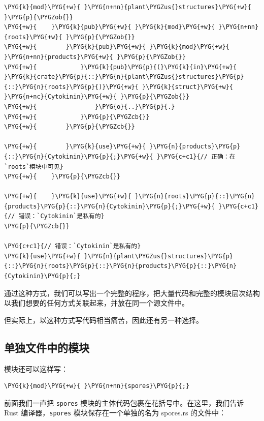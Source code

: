 \begin{Verbatim}[commandchars=\\\{\},breaklines=true,breakanywhere=true,fontsize=\codefont,xleftmargin=17bp]
\PYG{k}{mod}\PYG{+w}{ }\PYG{n+nn}{plant\PYGZus{}structures}\PYG{+w}{ }\PYG{p}{\PYGZob{}}
\PYG{+w}{    }\PYG{k}{pub}\PYG{+w}{ }\PYG{k}{mod}\PYG{+w}{ }\PYG{n+nn}{roots}\PYG{+w}{ }\PYG{p}{\PYGZob{}}
\PYG{+w}{        }\PYG{k}{pub}\PYG{+w}{ }\PYG{k}{mod}\PYG{+w}{ }\PYG{n+nn}{products}\PYG{+w}{ }\PYG{p}{\PYGZob{}}
\PYG{+w}{            }\PYG{k}{pub}\PYG{p}{(}\PYG{k}{in}\PYG{+w}{ }\PYG{k}{crate}\PYG{p}{::}\PYG{n}{plant\PYGZus{}structures}\PYG{p}{::}\PYG{n}{roots}\PYG{p}{)}\PYG{+w}{ }\PYG{k}{struct}\PYG{+w}{ }\PYG{n+nc}{Cytokinin}\PYG{+w}{ }\PYG{p}{\PYGZob{}}
\PYG{+w}{                }\PYG{o}{..}\PYG{p}{.}
\PYG{+w}{            }\PYG{p}{\PYGZcb{}}
\PYG{+w}{        }\PYG{p}{\PYGZcb{}}

\PYG{+w}{        }\PYG{k}{use}\PYG{+w}{ }\PYG{n}{products}\PYG{p}{::}\PYG{n}{Cytokinin}\PYG{p}{;}\PYG{+w}{ }\PYG{c+c1}{// 正确：在`roots`模块中可见}
\PYG{+w}{    }\PYG{p}{\PYGZcb{}}

\PYG{+w}{    }\PYG{k}{use}\PYG{+w}{ }\PYG{n}{roots}\PYG{p}{::}\PYG{n}{products}\PYG{p}{::}\PYG{n}{Cytokinin}\PYG{p}{;}\PYG{+w}{ }\PYG{c+c1}{// 错误：`Cytokinin`是私有的}
\PYG{p}{\PYGZcb{}}

\PYG{c+c1}{// 错误：`Cytokinin`是私有的}
\PYG{k}{use}\PYG{+w}{ }\PYG{n}{plant\PYGZus{}structures}\PYG{p}{::}\PYG{n}{roots}\PYG{p}{::}\PYG{n}{products}\PYG{p}{::}\PYG{n}{Cytokinin}\PYG{p}{;}
\end{Verbatim}

通过这种方式，我们可以写出一个完整的程序，把大量代码和完整的模块层次结构以我们想要的任何方式关联起来，并放在同一个源文件中。

但实际上，以这种方式写代码相当痛苦，因此还有另一种选择。

\subsection{单独文件中的模块}

模块还可以这样写：

\begin{Verbatim}[commandchars=\\\{\},breaklines=true,breakanywhere=true,fontsize=\codefont,xleftmargin=17bp]
\PYG{k}{mod}\PYG{+w}{ }\PYG{n+nn}{spores}\PYG{p}{;}
\end{Verbatim}

前面我们一直把 \texttt{spores} 模块的主体代码包裹在花括号中。在这里，我们告诉 Rust 编译器，\texttt{spores} 模块保存在一个单独的名为 spores.rs 的文件中：

